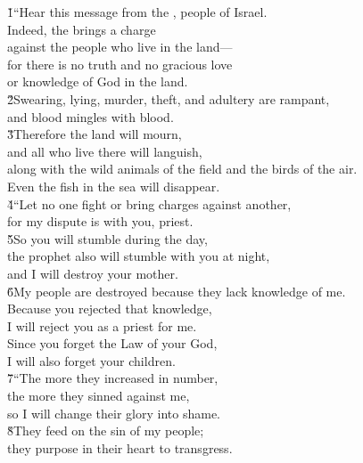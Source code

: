 \begin{poetry}
\poeml {}
\v{1}``Hear this message from the , people of Israel. \\
\poemll    Indeed, the  brings a charge \\
\poemll    against the people who live in the land--- \\
\poeml for there is no truth and no gracious love \\
\poemll    or knowledge of God in the land. \\
\poeml \v{2}Swearing, lying, murder, theft, and adultery are rampant, \\
\poemll    and blood mingles with blood. \\
\poeml \v{3}Therefore the land will mourn, \\
\poemll    and all who live there will languish, \\
\poeml along with the wild animals of the field and the birds of the air. \\
\poemll    Even the fish in the sea will disappear. \\
\poeml \v{4}``Let no one fight or bring charges against another, \\
\poemll    for my dispute is with you, priest. \\
\poeml \v{5}So you will stumble during the day, \\
\poemll    the prophet also will stumble with you at night, \\
\poemlll       and I will destroy your mother. \\
\poeml \v{6}My people are destroyed because they lack knowledge of me. \\
\poemll    Because you rejected that knowledge, \\
\poemlll       I will reject you as a priest for me. \\
\poeml Since you forget the Law of your God, \\
\poemll    I will also forget your children. \\
\poeml \v{7}``The more they increased in number, \\
\poemll    the more they sinned against me, \\
\poemlll       so I will change their glory into shame. \\
\poeml \v{8}They feed on the sin of my people; \\
\poemll    they purpose in their heart to transgress. \\

\end{poetry}
